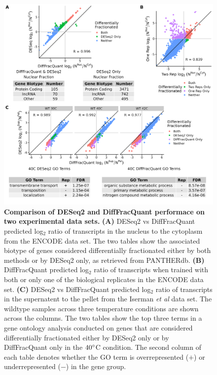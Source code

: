 \documentclass[../main.tex]{subfiles}
\begin{document}
\begin{figure}[p!]

{\centering \includegraphics[width=1\linewidth]{figures/DESeq_vs_bayesian_encode_and_iserman_combined.png} 

}

\caption[Experimental data performance.]{\textbf{Comparison of DESeq2 and DiffFracQuant performace on two experimental data sets.} \textbf{(A)} DESeq2 vs DiffFracQuant predicted log$_2$ ratio of transcripts in the nucleus to the cytoplasm from the ENCODE data set. The two tables show the associated biotype of genes considered differentially fractionated either by both methods or by DESeq2 only, as retrieved from PANTHERdb. \textbf{(B)} DiffFracQuant predicted log$_2$ ratio of transcripts when trained with both or only one of the biological replicates in the ENCODE data set. \textbf{(C)} DESeq2 vs DiffFracQuant predicted log$_2$ ratio of transcripts in the supernatent to the pellet from the Iserman \textit{et al} data set. The wildtype samples across three temperature conditions are shown across the columns. The two tables show the top three terms in a gene ontology analysis conducted on genes that are considered differentially fractionated either by DESeq2 only or by DiffFracQuant only in the $40\degree$C condition. The second column of each table denotes whether the GO term is overrepresented ($+$) or underrepresented ($-$) in the gene group.} \label{fig:encode-iserman-data-results}
\end{figure}
\end{document}
